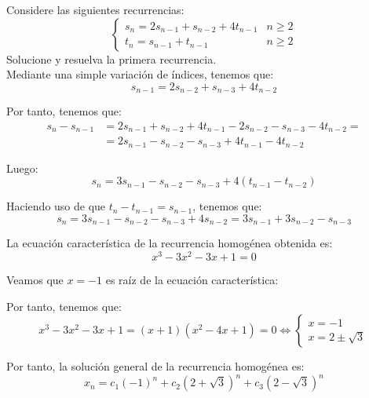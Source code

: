 \begin{ejercicio}
    Considere las siguientes recurrencias:
    \begin{equation*}
        \left\{
            \begin{array}{ll}
                s_n  = 2s_{n-1} + s_{n-2} + 4t_{n-1} & n\geq 2 \\
                t_n = s_{n-1} + t_{n-1} & n\geq 2
            \end{array}
        \right.
    \end{equation*}
    Solucione y resuelva la primera recurrencia.\\

    Mediante una simple variación de índices, tenemos que:
    \begin{equation*}
        s_{n-1} = 2s_{n-2} + s_{n-3} + 4t_{n-2}
    \end{equation*}

    Por tanto, tenemos que:
    \begin{align*}
        s_n - s_{n-1} &= 2s_{n-1} + s_{n-2} + 4t_{n-1} - 2s_{n-2} - s_{n-3} - 4t_{n-2} =\\
        &= 2s_{n-1} - s_{n-2} - s_{n-3} + 4t_{n-1} - 4t_{n-2}
    \end{align*}

    Luego:
    \begin{equation*}
        s_n = 3s_{n-1} - s_{n-2} - s_{n-3} + 4(t_{n-1} - t_{n-2})
    \end{equation*}

    Haciendo uso de que $t_n - t_{n-1} = s_{n-1}$, tenemos que:
    \begin{equation*}
        s_n = 3s_{n-1} - s_{n-2} - s_{n-3} + 4s_{n-2} = 3s_{n-1} + 3s_{n-2} - s_{n-3}
    \end{equation*}

    La ecuación característica de la recurrencia homogénea obtenida es:
    \begin{equation*}
        x^3 - 3x^2 - 3x + 1 = 0
    \end{equation*}

    Veamos que $x=-1$ es raíz de la ecuación característica:
    \begin{figure}[H]
        \centering
    \end{figure}

    Por tanto, tenemos que:
    \begin{equation*}
        x^3 - 3x^2 - 3x + 1 = (x+1)(x^2 - 4x + 1) = 0 \Longleftrightarrow
        \left\{\begin{array}{l}
            x = -1 \\
            x = 2\pm \sqrt{3}
        \end{array}\right.
    \end{equation*}

    Por tanto, la solución general de la recurrencia homogénea es:
    \begin{equation*}
        x_n = c_1(-1)^n + c_2(2+\sqrt{3})^n + c_3(2-\sqrt{3})^n
    \end{equation*}
\end{ejercicio}



